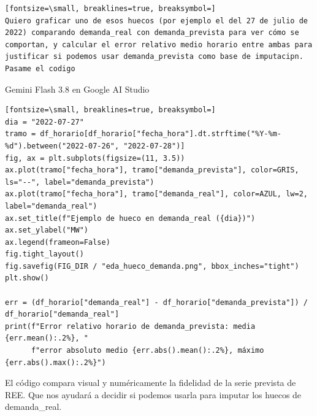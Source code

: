 \documentclass[12pt,a4paper,oneside]{book}
\begin{document}
\begin{iaprompt}
\begin{Verbatim}[fontsize=\small, breaklines=true, breaksymbol=]
Quiero graficar uno de esos huecos (por ejemplo el del 27 de julio de 2022) comparando demanda_real con demanda_prevista para ver cómo se comportan, y calcular el error relativo medio horario entre ambas para justificar si podemos usar demanda_prevista como base de imputacipn. Pasame el codigo
\end{Verbatim}
\end{iaprompt}
\begin{iaresp}{Gemini Flash 3.8 en Google AI Studio}
\begin{Verbatim}[fontsize=\small, breaklines=true, breaksymbol=]
dia = "2022-07-27"
tramo = df_horario[df_horario["fecha_hora"].dt.strftime("%Y-%m-%d").between("2022-07-26", "2022-07-28")]
fig, ax = plt.subplots(figsize=(11, 3.5))
ax.plot(tramo["fecha_hora"], tramo["demanda_prevista"], color=GRIS, ls="--", label="demanda_prevista")
ax.plot(tramo["fecha_hora"], tramo["demanda_real"], color=AZUL, lw=2, label="demanda_real")
ax.set_title(f"Ejemplo de hueco en demanda_real ({dia})")
ax.set_ylabel("MW")
ax.legend(frameon=False)
fig.tight_layout()
fig.savefig(FIG_DIR / "eda_hueco_demanda.png", bbox_inches="tight")
plt.show()

err = (df_horario["demanda_real"] - df_horario["demanda_prevista"]) / df_horario["demanda_real"]
print(f"Error relativo horario de demanda_prevista: media {err.mean():.2%}, "
      f"error absoluto medio {err.abs().mean():.2%}, máximo {err.abs().max():.2%}")
\end{Verbatim}
\end{iaresp}
\begin{iaanalisis}
El código compara visual y numéricamente la fidelidad de la serie prevista de REE. Que nos ayudará a decidir si podemos usarla para imputar los huecos de demanda_real.
\end{iaanalisis}
\end{document}
